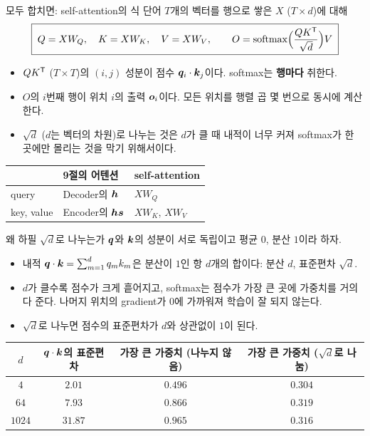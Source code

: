 \documentclass[aspectratio=169,11pt]{beamer}
\begin{document}
\begin{frame}{모두 합치면: self-attention의 식}
단어 $T$개의 벡터를 행으로 쌓은 $X$ ($T\times d$)에 대해
\[
\boxed{\;Q=XW_Q,\quad K=XW_K,\quad V=XW_V,\qquad
O=\operatorname{softmax}\!\Big(\frac{QK^{\mathsf T}}{\sqrt d}\Big)V\;}
\]
\begin{itemize}
\item $QK^{\mathsf T}$ ($T\times T$)의 $(i,j)$ 성분이 점수 $\bm{q}_i\cdot\bm{k}_j$이다.
  softmax는 \textbf{행마다} 취한다.
\item $O$의 $i$번째 행이 위치 $i$의 출력 $\bm{o}_i$이다.
  모든 위치를 행렬 곱 몇 번으로 동시에 계산한다.
\item $\sqrt d$ ($d$는 벡터의 차원)로 나누는 것은 $d$가 클 때 내적이 너무 커져
  softmax가 한 곳에만 몰리는 것을 막기 위해서이다.
\end{itemize}
\vskip1mm
\begin{center}
\small
\begin{tabular}{@{}lll@{}}
\toprule
& 9절의 어텐션 & self-attention \\
\midrule
query & Decoder의 $\bm{h}$ & $XW_Q$ \\
key, value & Encoder의 $\bm{hs}$ & $XW_K$, $XW_V$ \\
\bottomrule
\end{tabular}
\end{center}
\end{frame}

\begin{frame}{왜 하필 $\sqrt d$로 나누는가}
$\bm{q}$와 $\bm{k}$의 성분이 서로 독립이고 평균 $0$, 분산 $1$이라 하자.
\begin{itemize}
\item 내적 $\bm{q}\cdot\bm{k}=\sum_{m=1}^d q_mk_m$은 분산이 $1$인 항 $d$개의 합이다:
  분산 $d$, 표준편차 $\sqrt d$.
\item $d$가 클수록 점수가 크게 흩어지고, softmax는 점수가 가장 큰 곳에 가중치를 거의 다 준다.
  나머지 위치의 gradient가 $0$에 가까워져 학습이 잘 되지 않는다.
\item $\sqrt d$로 나누면 점수의 표준편차가 $d$와 상관없이 $1$이 된다.
\end{itemize}
\begin{center}
\small
\begin{tabular}{@{}cccc@{}}
\toprule
$d$ & $\bm{q}\cdot\bm{k}$의 표준편차 & 가장 큰 가중치 (나누지 않음)
  & 가장 큰 가중치 ($\sqrt d$로 나눔) \\
\midrule
$4$ & $2.01$ & $0.496$ & $0.304$ \\
$64$ & $7.93$ & $0.866$ & $0.319$ \\
$1024$ & $31.87$ & $0.965$ & $0.316$ \\
\bottomrule
\end{tabular}
\end{center}
\end{frame}
\end{document}
